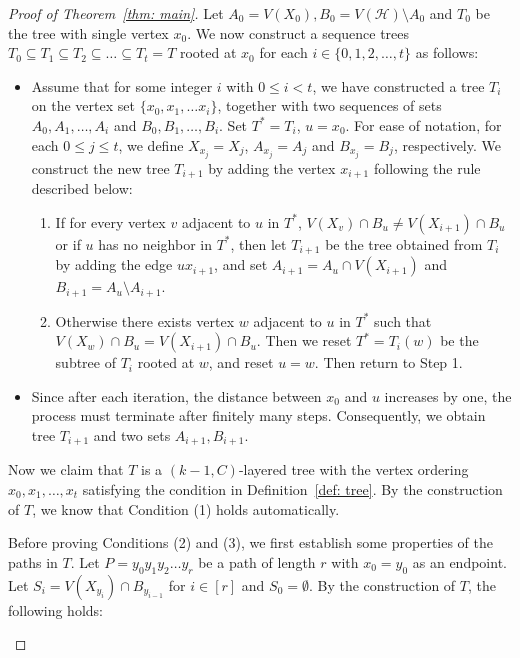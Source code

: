 \documentclass[11pt,a4paper]{article}
\begin{document}
\begin{proof}[Proof of Theorem~\ref{thm: main}]
Let $A_0 = V(X_0), B_0 = V(\mathcal{H})\setminus A_0$ and $T_0$ be the tree with single vertex $x_0$.
We now construct a sequence trees $T_0 \subseteq T_1 \subseteq T_2 \subseteq \dots \subseteq T_t = T$ rooted at $x_0$ for each $i\in \{0,1,2,\dots,t\}$ as follows:
\begin{itemize}
    \item Assume that for some integer $i$ with $0\le i<t$, we have constructed a tree $T_i$ on the vertex set $\{x_0,x_1,\dots x_i\}$, together with two sequences of sets $A_0,A_1,\dots,A_i$ and  $B_0,B_1,\dots,B_i$. Set $T^* = T_i$, $u=x_0$. For ease of notation, for each $0\le j\le t$, we define $X_{x_j} =X_j$, $A_{x_j} =A_j$ and $B_{x_j} = B_j$, respectively. We construct the new tree $T_{i+1}$ by adding the vertex $x_{i+1}$ following the rule described below:
    \begin{enumerate}  
    \item  If for every vertex $v$ adjacent to $u$ in $T^*$, $V(X_v)\cap B_u \ne V(X_{i+1}) \cap B_u $ or if $u$ has no neighbor in $T^*$, then let $T_{i+1}$ be the tree obtained from $T_{i}$ by adding the edge $u x_{i+1}$, and set $A_{i+1} = A_u\cap V(X_{i+1})$ and $B_{i+1} = A_{u} \setminus A_{i+1}$.
    \item Otherwise there exists vertex $w$ adjacent to $u$ in $T^*$ such that $V(X_w)\cap B_u = V(X_{i+1}) \cap B_u $. Then we reset $T^* = T_i(w)$ be the subtree of $T_i$ rooted at $w$, and reset $u=w$. Then return to Step 1.
    \end{enumerate}
    \item Since after each iteration, the distance between $x_0$
 and $u$ increases by one, the process must terminate after finitely many steps. Consequently, we obtain tree $T_{i+1}$ and two sets $A_{i+1},B_{i+1}$.
\end{itemize}
Now we claim that $T$ is a $(k-1,C)$-layered tree with the vertex ordering $x_0,x_1,\dots,x_t$ satisfying the
condition in Definition~\ref{def: tree}.
By the construction of 
$T$, we know that Condition (1) holds automatically. 

Before proving Conditions (2) and (3), we first establish some properties of the paths in $T$.
Let $P= y_0y_1y_2\dots y_r$ be a path of length $r$ with $x_0 =y_0$ as an endpoint.
Let $S_i = V(X_{y_i})\cap B_{y_{i-1}} $ for $i\in [r]$ and $S_0 = \emptyset$.
By the construction of $T$, the following holds:
\begin{figure}[ht]
    \centering
{}
\end{figure}
\end{proof}
\end{document}
